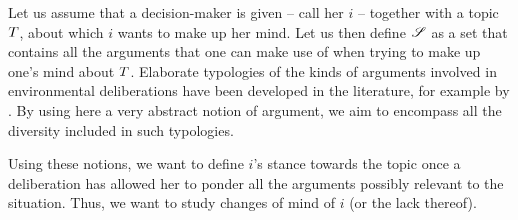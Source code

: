 \documentclass[version=3.21, pagesize, twoside=off, bibliography=totoc, DIV=calc, fontsize=12pt, a4paper, french, english]{scrartcl}
\begin{document}
Let us assume that a decision-maker is given -- call her $i$ -- together with a topic $T$, about which $i$ wants to make up her mind. 
Let us then define $\mathscr{S}$ as a set that contains all the arguments that one can make use of when trying to make up one’s mind about $T$.
Elaborate typologies of the kinds of arguments involved in environmental deliberations have been developed in the literature, for example by \citet{chateauraynaud_contrainte_2007}. 
By using here a very abstract notion of argument, we aim to encompass all the diversity included in such typologies. 

Using these notions, we want to define $i$’s stance towards the topic once a deliberation has allowed her to ponder all the arguments possibly relevant to the situation. 
Thus, we want to study changes of mind of $i$ (or the lack thereof).
\end{document}
